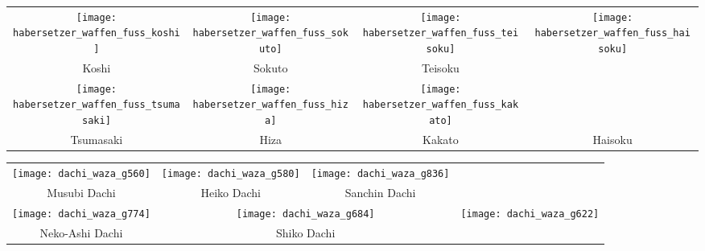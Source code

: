 \clearpage
\pagebreak
\setcounter{num}{0}
\setcounter{numz}{0}
\begin{tcolorbox}[width=\textwidth,height=\textheight,right=12pt,left=12pt,colframe=GKD,colback=white,fonttitle=\bfseries,coltitle=white,title=Allgemeines:\indent Körperwaffen]
	\null\vfill\null	
	\begin{tabularx}{\textwidth}{cccc}
		\texttt{[image: habersetzer\_waffen\_fuss\_koshi]} 		& \texttt{[image: habersetzer\_waffen\_fuss\_sokuto]} 		& \texttt{[image: habersetzer\_waffen\_fuss\_teisoku]} &
		\multirow{3}{*}{\texttt{[image: habersetzer\_waffen\_fuss\_haisoku]}}
		\\
		Koshi 		& Sokuto 	& Teisoku &\\
		\texttt{[image: habersetzer\_waffen\_fuss\_tsumasaki]} 	& \texttt{[image: habersetzer\_waffen\_fuss\_hiza]} 		&  \texttt{[image: habersetzer\_waffen\_fuss\_kakato]} &\\
		Tsumasaki 	& Hiza 		& Kakato & Haisoku\\
	\end{tabularx}
	\null\vfill\null
\end{tcolorbox}
\clearpage
\pagebreak
\begin{tcolorbox}[width=\textwidth,height=\textheight,right=12pt,left=12pt,colframe=GKD,colback=white,fonttitle=\bfseries,coltitle=white,title=Allgemeines:\indent Grundlegende Dachi Waza]
	\null\vfill\null
	\setcounter{num}{0}
	\setcounter{numz}{0}	
	\begin{tabularx}{\textwidth}{cccc}
		\texttt{[image: dachi\_waza\_g560]}	&
		\texttt{[image: dachi\_waza\_g580]} &
		\texttt{[image: dachi\_waza\_g836]} & \\
		Musubi Dachi 		& Heiko Dachi 	& Sanchin Dachi & \\
		\texttt{[image: dachi\_waza\_g774]} & \multicolumn{2}{c}{\texttt{[image: dachi\_waza\_g684]}} &
		\multirow[t]{3}{*}{\texttt{[image: dachi\_waza\_g622]}}\\
		Neko-Ashi Dachi 	& \multicolumn{2}{c}{Shiko Dachi} 	& Zenkutsu Dachi  \\							
	\end{tabularx}\\\null\vfill\null
\end{tcolorbox}
\clearpage
\pagebreak
